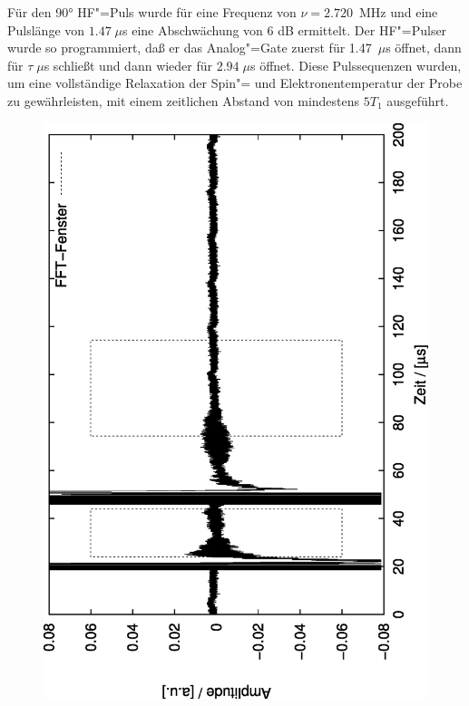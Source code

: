 Für den 90° HF"=Puls wurde für eine Frequenz von $\nu=2.720$~MHz und eine Pulslänge von $1.47\;\mu$s
eine Abschwächung von 6 dB ermittelt. Der HF"=Pulser wurde so programmiert,
daß er das Analog"=Gate zuerst für 1.47~$\mu$s öffnet, dann für $\tau\;\mu$s schließt und dann wieder für
$2.94\;\mu$s öffnet. Diese Pulssequenzen wurden, um eine vollständige Relaxation der Spin"= und
Elektronentemperatur der Probe zu gewährleisten, mit einem zeitlichen Abstand von mindestens
$5T_1$ ausgeführt.

 \begin{figure}[htp]
	\begin{center}
		\includegraphics[angle=-90,width=\bigwidth]{plots/t2_auswert_shots_1}


\end{center}
\end{figure}
